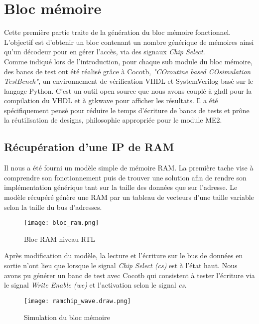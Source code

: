 \section{Bloc mémoire}

\indent Cette première partie traite de la génération du bloc mémoire fonctionnel.
L'objectif est d'obtenir un bloc contenant un nombre générique de mémoires ainsi qu'un décodeur pour en gérer l'accès, via des signaux \textit{Chip Select}. \\
\indent Comme indiqué lors de l'introduction, pour chaque sub module du bloc mémoire, des bancs de test ont été réalisé grâce à Cocotb, \textit{"COroutine based COsimulation TestBench"}, un environnement de vérification VHDL et SystemVerilog basé sur le langage Python.
C'est un outil open source que nous avons couplé à ghdl pour la compilation du VHDL et à gtkwave pour afficher les résultats.
Il a été spécifiquement pensé pour réduire le temps d'écriture de bancs de tests et prône la réutilisation de designs, philosophie appropriée pour le module ME2.

\subsection{Récupération d'une IP de RAM}

\indent Il nous a été fourni un modèle simple de mémoire RAM.
La première tache vise à comprendre son fonctionnement puis de trouver une solution afin de rendre son implémentation générique tant sur la taille des données que sur l'adresse.
Le modèle récupéré génère une RAM par un tableau de vecteurs d'une taille variable selon la taille du bus d'adresses.

\begin{figure}[h]
	\centering
	\texttt{[image: bloc\_ram.png]}
	\caption{Bloc RAM niveau RTL}
	\label{fig:synth_bloc_ram}
\end{figure}

\indent Après modification du modèle, la lecture et l'écriture sur le bus de données en sortie n'ont lieu que lorsque le signal \textit{Chip Select (cs)} est à l'état haut.
Nous avons pu générer un banc de test avec Cocotb qui consistent à tester l'écriture via le signal \textit{Write Enable (we)} et l'activation selon le signal \textit{cs}.

\begin{figure}[h]
	\centering
	\texttt{[image: ramchip\_wave.draw.png]}
	\caption{Simulation du bloc mémoire}
	\label{fig:wave_bloc_ram}
\end{figure}


